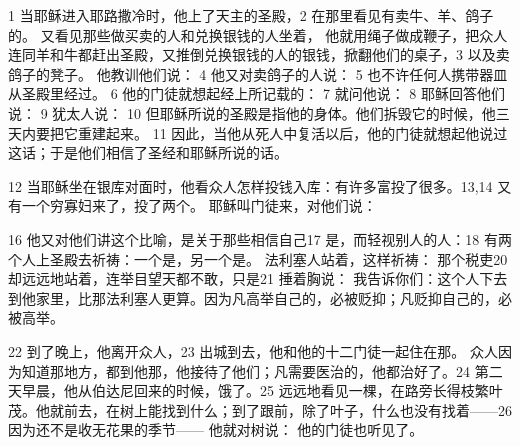 1 当耶稣进入耶路撒冷时，他上了天主的圣殿，2 在那里看见有卖牛、羊、鸽子的。 又看见那些做买卖的人和兑换银钱的人坐着， 他就用绳子做成鞭子，把众人连同羊和牛都赶出圣殿，又推倒兑换银钱的人的银钱，掀翻他们的桌子，3 以及卖鸽子的凳子。 他教训他们说：  4 他又对卖鸽子的人说：  5 也不许任何人携带器皿从圣殿里经过。 6 他的门徒就想起经上所记载的：  7 就问他说：  8 耶稣回答他们说：  9 犹太人说：  10 但耶稣所说的圣殿是指他的身体。他们拆毁它的时候，他三天内要把它重建起来。 11 因此，当他从死人中复活以后，他的门徒就想起他说过这话；于是他们相信了圣经和耶稣所说的话。\par

12  当耶稣坐在银库对面时，他看众人怎样投钱入库：有许多富投了很多。13,14  又有一个穷寡妇来了，投了两个。 耶稣叫门徒来，对他们说：\par

16  他又对他们讲这个比喻，是关于那些相信自己17 是，而轻视别人的人：18  有两个人上圣殿去祈祷：一个是，另一个是。 法利塞人站着，这样祈祷：  那个税吏20 却远远地站着，连举目望天都不敢，只是21 捶着胸说：  我告诉你们：这个人下去到他家里，比那法利塞人更算。因为凡高举自己的，必被贬抑；凡贬抑自己的，必被高举。\par

22  到了晚上，他离开众人，23 出城到去，他和他的十二门徒一起住在那。 众人因为知道那地方，都到他那，他接待了他们；凡需要医治的，他都治好了。24  第二天早晨，他从伯达尼回来的时候，饿了。25  远远地看见一棵，在路旁长得枝繁叶茂。他就前去，在树上能找到什么；到了跟前，除了叶子，什么也没有找着——26 因为还不是收无花果的季节—— 他就对树说： 他的门徒也听见了。\par

